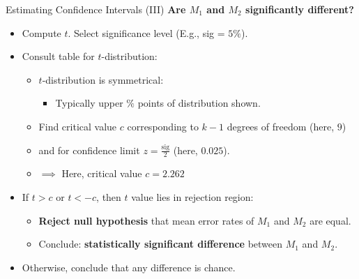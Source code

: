 \begin{frame}{Estimating Confidence Intervals (III)}
	\textbf{Are $M_1$ and $M_2$ {\color{airforceblue} significantly different}?}
	\begin{itemize}
		\item Compute $t$. Select significance level (E.g., sig = $5 \%$).
		\item Consult table for $t$-distribution:
		      \begin{itemize}
			      \item $t$-distribution is symmetrical:
			            \begin{itemize}
				            \item Typically upper $\%$ points of distribution shown.
			            \end{itemize}
			      \item Find critical value $c$ corresponding to $k-1$ degrees of freedom (here, $9$)
			      \item and for confidence limit $z = \frac{\text{sig}}{2}$ (here, $0.025$).
			      \item $\implies$ Here, critical value $c = 2.262$
		      \end{itemize}
		\item If $t > c$ or $t < -c$, then $t$ value lies in rejection region:
		      \begin{itemize}
			      \item \textbf{Reject null hypothesis} that mean error rates of $M_1$ and $M_2$ are equal.
			      \item Conclude: \textbf{statistically significant difference} between $M_1$ and $M_2$.
		      \end{itemize}
		\item Otherwise, conclude that any difference is chance.
	\end{itemize}
\end{frame}

